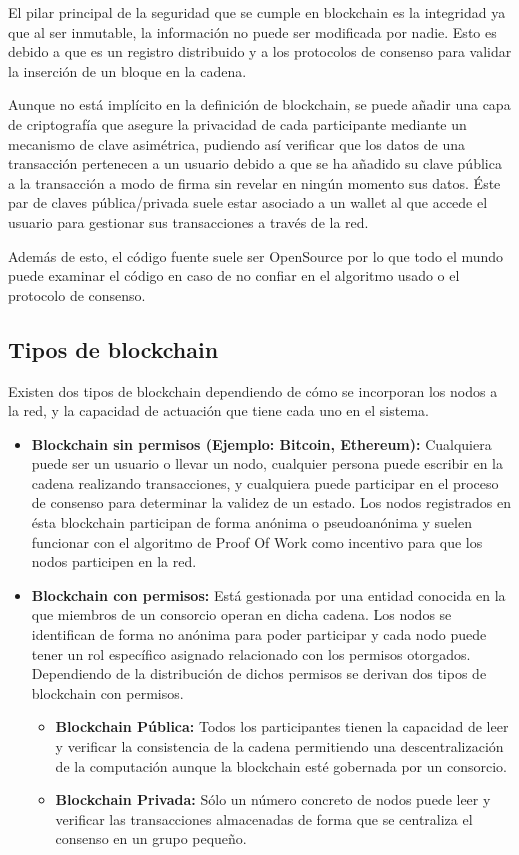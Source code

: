 \documentclass[12pt]{report}
\begin{document}
El pilar principal de la seguridad que se cumple en blockchain es la integridad ya que al ser inmutable, la información no puede ser modificada por nadie. Esto es debido a que es un registro distribuido y a los protocolos de consenso para validar la inserción de un bloque en la cadena.

Aunque no está implícito en la definición de blockchain, se puede añadir una capa de criptografía que asegure la privacidad de cada participante mediante un mecanismo de clave asimétrica, pudiendo así verificar que los datos de una transacción pertenecen a un usuario debido a que se ha añadido su clave pública a la transacción a modo de firma sin revelar en ningún momento sus datos. Éste par de claves pública/privada suele estar asociado a un wallet al que accede el usuario para gestionar sus transacciones a través de la red.



Además de esto, el código fuente suele ser OpenSource por lo que todo el mundo puede examinar el código en caso de no confiar en el algoritmo usado o el protocolo de consenso.

\subsection{Tipos de blockchain}
Existen dos tipos de blockchain dependiendo de cómo se incorporan los nodos a la red, y la capacidad de actuación que tiene cada uno en el sistema.

\begin{itemize}


\item \textbf{Blockchain sin permisos (Ejemplo: Bitcoin, Ethereum):} 
Cualquiera puede ser un usuario o llevar un nodo, cualquier persona puede escribir en la cadena realizando transacciones, y cualquiera puede participar en el proceso de consenso para determinar la validez de un estado.
Los nodos registrados en ésta blockchain participan de forma anónima o pseudoanónima y suelen funcionar con el algoritmo de Proof Of Work como incentivo para que los nodos participen en la red.

\item \textbf{Blockchain con permisos:} 
Está gestionada por una entidad conocida en la que miembros de un consorcio operan en dicha cadena.
Los nodos se identifican de forma no anónima para poder participar y cada nodo puede tener un rol específico asignado relacionado con los permisos otorgados.
Dependiendo de la distribución de dichos permisos se derivan dos tipos de blockchain con permisos.

\begin{itemize}
\item
\textbf{Blockchain Pública:}
Todos los participantes tienen la capacidad de leer y verificar la consistencia de la cadena permitiendo una descentralización de la computación aunque la blockchain esté gobernada por un consorcio.
\item
\textbf{Blockchain Privada:}
Sólo un número concreto de nodos puede leer y verificar las transacciones almacenadas de forma que se centraliza el consenso en un grupo pequeño.
\end{itemize}

\end{itemize}
\end{document}
